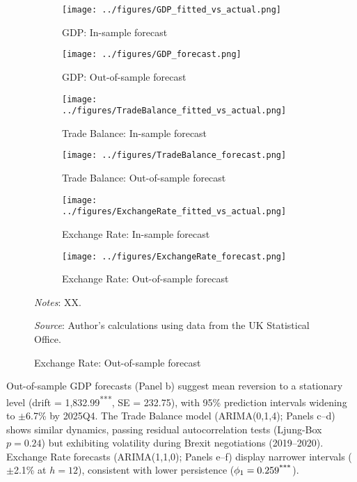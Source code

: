 \documentclass[
]{article}
\begin{document}
	\begin{figure}[htbp]
		\centering
		\caption{\textsc{Forecast performance for UK GDP, Exchange Rate, and Trade Balance}}
		\label{fig:forecast_results}
		\begin{subfigure}[b]{0.45\textwidth}
			\texttt{[image: ../figures/GDP\_fitted\_vs\_actual.png]}
			\caption{GDP: In-sample forecast}
			\label{fig:gdp_in}
		\end{subfigure}
		\hfill
		\begin{subfigure}[b]{0.45\textwidth}
			\texttt{[image: ../figures/GDP\_forecast.png]}
			\caption{GDP: Out-of-sample forecast}
			\label{fig:gdp_out}
		\end{subfigure}
		
		\begin{subfigure}[b]{0.45\textwidth}
			\texttt{[image: ../figures/TradeBalance\_fitted\_vs\_actual.png]}
			\caption{Trade Balance: In-sample forecast}
			\label{fig:tb_in}
		\end{subfigure}
		\hfill
		\begin{subfigure}[b]{0.45\textwidth}
			\texttt{[image: ../figures/TradeBalance\_forecast.png]}
			\caption{Trade Balance: Out-of-sample forecast}
			\label{fig:tb_out}
		\end{subfigure}
		
		\begin{subfigure}[b]{0.45\textwidth}
			\texttt{[image: ../figures/ExchangeRate\_fitted\_vs\_actual.png]}
			\caption{Exchange Rate: In-sample forecast}
			\label{fig:er_in}
		\end{subfigure}
		\hfill
		\begin{subfigure}[b]{0.45\textwidth}
			\texttt{[image: ../figures/ExchangeRate\_forecast.png]}
			\caption{Exchange Rate: Out-of-sample forecast}
			\label{fig:er_out}
		\end{subfigure}
		
		\begin{minipage}{\textwidth}
			\scriptsize
			\textit{Notes}: XX.
			
			\textit{Source}: Author's calculations using data from the UK Statistical Office.
		\end{minipage}
	\end{figure}
	
	Out-of-sample GDP forecasts (Panel b) suggest mean reversion to a stationary 
	level (drift = 1,832.99\textsuperscript{***}, SE = 232.75), with 95\% prediction 
	intervals widening to $\pm$6.7\% by 2025Q4. The Trade Balance model
	(ARIMA(0,1,4); Panels c--d) shows similar dynamics, passing residual 
	autocorrelation tests (Ljung-Box $p = 0.24$) but exhibiting volatility
	during Brexit negotiations (2019--2020). Exchange Rate forecasts (ARIMA(1,1,0); 
	Panels e--f) display narrower intervals ($\pm$2.1\% at $h=12$), consistent with 
	lower persistence ($\phi_1 = 0.259\textsuperscript{***}$). 
	
\end{document}
